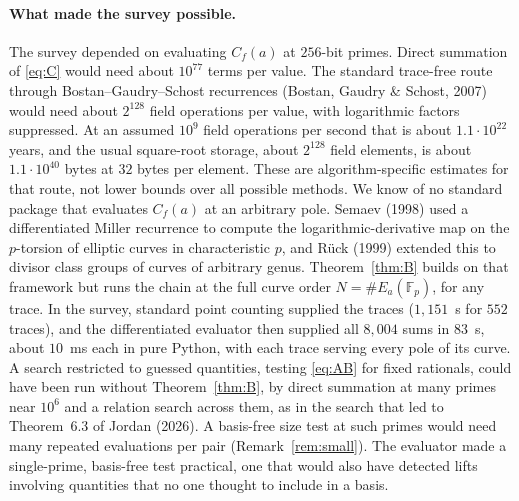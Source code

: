 \documentclass[11pt,a4paper]{article}
\numberwithin{equation}{section}
\theoremstyle{plain}
\theoremstyle{definition}
\newcommand{\F}{\mathbb{F}}
\begin{document}
\paragraph{What made the survey possible.} The survey depended on evaluating $C_f(a)$ at $256$-bit primes. Direct summation of \eqref{eq:C} would need about $10^{77}$ terms per value. The standard trace-free route through Bostan--Gaudry--Schost recurrences (Bostan, Gaudry \& Schost, 2007) would need about $2^{128}$ field operations per value, with logarithmic factors suppressed. At an assumed $10^9$ field operations per second that is about $1.1\cdot10^{22}$ years, and the usual square-root storage, about $2^{128}$ field elements, is about $1.1\cdot10^{40}$ bytes at $32$ bytes per element. These are algorithm-specific estimates for that route, not lower bounds over all possible methods. We know of no standard package that evaluates $C_f(a)$ at an arbitrary pole. Semaev (1998) used a differentiated Miller recurrence to compute the logarithmic-derivative map on the $p$-torsion of elliptic curves in characteristic $p$, and R\"uck (1999) extended this to divisor class groups of curves of arbitrary genus. Theorem~\ref{thm:B} builds on that framework but runs the chain at the full curve order $N=\#E_a(\F_p)$, for any trace. In the survey, standard point counting supplied the traces ($1{,}151$~s for $552$ traces), and the differentiated evaluator then supplied all $8{,}004$ sums in $83$~s, about $10$~ms each in pure Python, with each trace serving every pole of its curve. A search restricted to guessed quantities, testing \eqref{eq:AB} for fixed rationals, could have been run without Theorem~\ref{thm:B}, by direct summation at many primes near $10^6$ and a relation search across them, as in the search that led to Theorem~6.3 of Jordan (2026). A basis-free size test at such primes would need many repeated evaluations per pair (Remark~\ref{rem:small}). The evaluator made a single-prime, basis-free test practical, one that would also have detected lifts involving quantities that no one thought to include in a basis.
\end{document}
